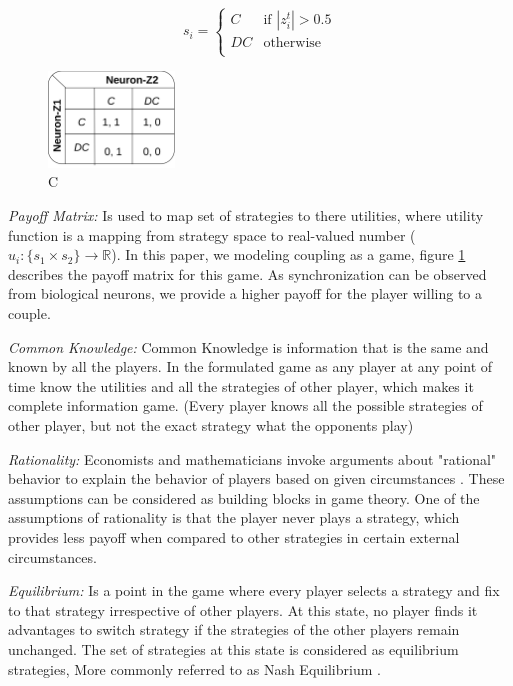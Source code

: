 \documentclass{article}
\begin{document}
\begin{equation}
  \label{eqn: potential_strat}
  s_i =
    \begin{cases}
      C & \text{if $|z_i^t| > 0.5$}\\
      DC & \text{otherwise}\\
    \end{cases}       
\end{equation}


\begin{figure}
 \centering
 \includegraphics[width=0.3\textwidth]{payoff.png}
 \caption{C}
 \label{fig: payoff}
\end{figure}

\textit{Payoff Matrix:} Is used to map set of strategies to there utilities, where utility function is a mapping from strategy space to real-valued number ($u_i: \{s_1 \times s_2\} \rightarrow \mathbb{R}$). In this paper, we modeling coupling as a game, figure \ref{fig: payoff} describes the payoff matrix for this game. As synchronization can be observed from biological neurons, we provide a higher payoff for the player willing to a couple.   

\textit{Common Knowledge:} Common Knowledge is information that is the same and known by all the players. In the formulated game as any player at any point of time know the utilities and all the strategies of other player, which makes it complete information game. (Every player knows all the possible strategies of other player, but not the exact strategy what the opponents play)

\textit{Rationality:} Economists and mathematicians invoke arguments about "rational" behavior to explain the behavior of players based on given circumstances \cite{bicchieri2004rationality}. These assumptions can be considered as building blocks in game theory. One of the assumptions of rationality is that the player never plays a strategy, which provides less payoff when compared to other strategies in certain external circumstances.

\textit{Equilibrium:} Is a point in the game where every player selects a strategy and fix to that strategy irrespective of other players. At this state, no player finds it advantages to switch strategy if the strategies of the other players remain unchanged. The set of strategies at this state is considered as equilibrium strategies, More commonly referred to as Nash Equilibrium \cite{holt2004nash}.
\end{document}
